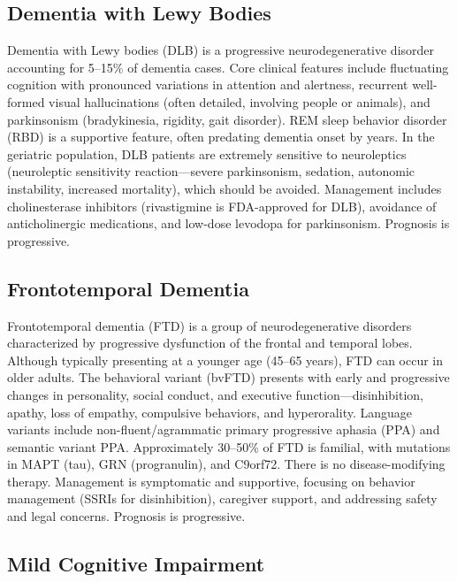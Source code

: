 \subsection{Dementia with Lewy Bodies}
\label{sec:Dementia with Lewy Bodies}
Dementia with Lewy bodies (DLB) is a progressive neurodegenerative disorder accounting for 5--15\% of dementia cases. Core clinical features include fluctuating cognition with pronounced variations in attention and alertness, recurrent well-formed visual hallucinations (often detailed, involving people or animals), and parkinsonism (bradykinesia, rigidity, gait disorder). REM sleep behavior disorder (RBD) is a supportive feature, often predating dementia onset by years. In the geriatric population, DLB patients are extremely sensitive to neuroleptics (neuroleptic sensitivity reaction---severe parkinsonism, sedation, autonomic instability, increased mortality), which should be avoided. Management includes cholinesterase inhibitors (rivastigmine is FDA-approved for DLB), avoidance of anticholinergic medications, and low-dose levodopa for parkinsonism. Prognosis is progressive.

\subsection{Frontotemporal Dementia}
\label{sec:geriatric:Frontotemporal Dementia}
Frontotemporal dementia (FTD) is a group of neurodegenerative disorders characterized by progressive dysfunction of the frontal and temporal lobes. Although typically presenting at a younger age (45--65 years), FTD can occur in older adults. The behavioral variant (bvFTD) presents with early and progressive changes in personality, social conduct, and executive function---disinhibition, apathy, loss of empathy, compulsive behaviors, and hyperorality. Language variants include non-fluent/agrammatic primary progressive aphasia (PPA) and semantic variant PPA. Approximately 30--50\% of FTD is familial, with mutations in MAPT (tau), GRN (progranulin), and C9orf72. There is no disease-modifying therapy. Management is symptomatic and supportive, focusing on behavior management (SSRIs for disinhibition), caregiver support, and addressing safety and legal concerns. Prognosis is progressive.

\subsection{Mild Cognitive Impairment}
\label{sec:Mild Cognitive Impairment}

